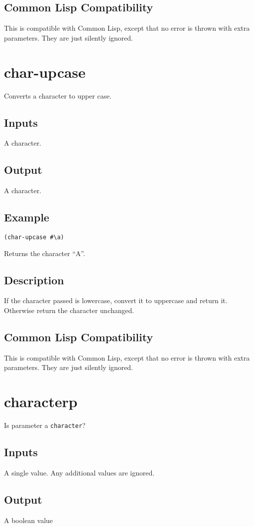 \documentclass[10pt, openany]{book}
\newcommand{\datatype}[1]{\texttt{#1}}
\newcommand{\cl}{Common Lisp}
\begin{document}
\subsection{Common Lisp Compatibility}
This is compatible with \cl, except that no error is thrown with extra parameters.  They are just silently ignored.

\section{char-upcase}
Converts a character to upper case.
\subsection{Inputs}
A character.
\subsection{Output}
A character.
\subsection{Example}
\begin{lstlisting}
(char-upcase #\a)
\end{lstlisting}
Returns the character ``A''.
\subsection{Description}
If the character passed is lowercase, convert it to uppercase and return it.  Otherwise return the character unchanged.
\subsection{Common Lisp Compatibility}
This is compatible with \cl, except that no error is thrown with extra parameters.  They are just silently ignored.

\section{characterp}
Is parameter a \datatype{character}?
\subsection{Inputs}
A single value.  Any additional values are ignored.
\subsection{Output}
A boolean value
\end{document}

